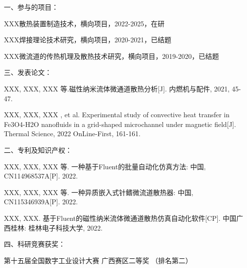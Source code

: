 \noindent %
一、参与的项目：
\begingroup
\setlength{\itemsep}{0bp}\setlength{\parskip}{0pt}\small
    \begin{enumerate}[label={[\arabic*]}] %
        \item XXX散热装置制造技术，横向项目，2022-2025，在研
        \item XXX焊接理论技术研究，横向项目，2020-2021，已结题
        \item XXX微流道的传热机理及散热技术研究，横向项目，2019-2020，已结题
        \end{enumerate}
\endgroup
\vspace{3mm}

\noindent %
三、发表论文：
\begingroup
\setlength{\itemsep}{0bp}\setlength{\parskip}{0pt}\small
    \begin{enumerate}[label={[\arabic*]}]  
        \item XXX, XXX, XXX 等.磁性纳米流体微通道散热分析[J]. 内燃机与配件, 2021, 45-47. 
        \item XXX, XXX, XXX , et al. Experimental study of convective heat transfer in {{Fe3O4-H2O}} nanofluids in a grid-shaped microchannel under magnetic field[J]. Thermal Science, 2022 OnLine-First, 161-161.
    \end{enumerate}
\endgroup
\vspace{3mm}

\noindent %
二、专利及知识产权：
\begingroup
\setlength{\itemsep}{0bp}\setlength{\parskip}{0pt}\small
    \begin{enumerate}[label={[\arabic*]}]  
        \item XXX, XXX, XXX 等. 一种基于Fluent的批量自动化仿真方法: 中国, CN114968537A[P]. 2022.
        \item XXX, XXX, XXX 等. 一种异质嵌入式针鳍微流道散热器: 中国, CN115346939A[P]. 2022.
        \item XXX, XXX. 基于Fluent的磁性纳米流体微通道散热仿真自动化软件[CP]. 中国广西桂林: 桂林电子科技大学, 2022.
    \end{enumerate}
\endgroup
\vspace{3mm}

\noindent %
四、科研竞赛获奖：
\begingroup
    \setlength{\itemsep}{0bp}\setlength{\parskip}{0pt}\small
    \begin{enumerate}[label={[\arabic*]}]  
        \item 第十五届全国数字工业设计大赛 广西赛区二等奖 （排名第二）   
    \end{enumerate}
\endgroup



